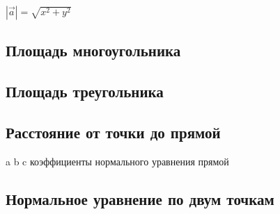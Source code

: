 \documentclass[a4paper]{article}
\begin{document}
\begin{multicols*}{2}
		 $|\vec a| = \sqrt{x^2 + y^2}$
		 
		 \subsection{Площадь многоугольника}
		 		 
		 \subsection{Площадь треугольника}
		 
		 \subsection{Расстояние от точки до прямой}
		 a b c коэффициенты нормального уравнения прямой
		 
		 \subsection{Нормальное уравнение по двум точкам}
		 	
	\end{multicols*}
\end{document}
